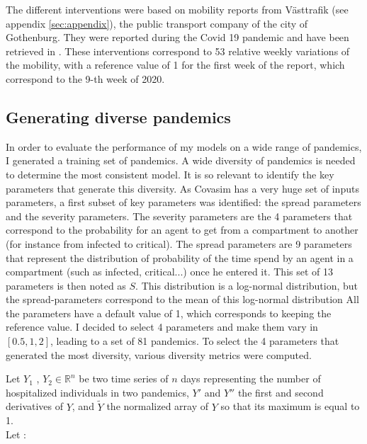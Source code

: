 The different interventions were based on mobility reports from Västtrafik (see appendix \ref{sec:appendix}), the public transport company of the city of Gothenburg. 
They were reported during the Covid 19 pandemic and have been retrieved in \cite{gerlee2021predicting}.
These interventions correspond to 53 relative weekly variations of the mobility, with a reference value of 1 for the first week of the report, which correspond to the 9-th week of 2020. 


\subsection{Generating diverse pandemics}
\label{sec:generating_divserse_pandemics}
In order to evaluate the performance of my models on a wide range of pandemics, I generated a training set of pandemics. 
A wide diversity of pandemics is needed to determine the most consistent model.
It is so relevant to identify the key parameters that generate this diversity.
As Covasim has a very huge set of inputs parameters, a first subset of key parameters was identified: the spread parameters and the severity parameters. 
The severity parameters are the 4 parameters that correspond to the probability for an agent to get from a compartment to another (for instance from infected to critical). 
The spread parameters are 9 parameters that represent the distribution of probability of the time spend by an agent in a compartment (such as infected, critical...) once he entered it. 
This set of 13 parameters is then noted as $S$. 
This distribution is a log-normal distribution, but the spread-parameters correspond to the mean of this log-normal distribution
All the parameters have a default value of 1, which corresponds to keeping the reference value. 
I decided to select 4 parameters and make them vary in $[0.5, 1, 2]$, leading to a set of 81 pandemics. 
To select the 4 parameters that generated the most diversity, various diversity metrics were computed. 

Let $Y_1$ ,  $Y_2 \in \mathbb{R}^n$  be two time series of $n$ days representing the number of hospitalized individuals in two pandemics, $Y'$ and $Y''$ the first and second derivatives of $Y$, and $\tilde{Y}$ the normalized array of $Y$ so that its maximum is equal to 1.  \\[0.2cm]

Let :  \\

